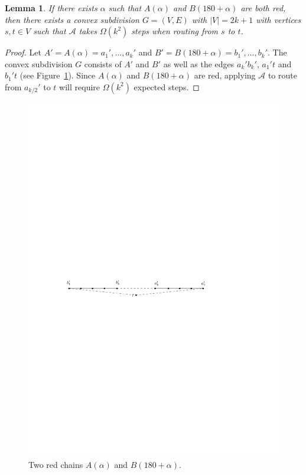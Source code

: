 \documentclass{elsarticle}
\newtheorem{lemma}{Lemma}%
\begin{document}
\begin{lemma}\label{lem:2red}
If there exists $\alpha$ such that $A(\alpha)$ and $B(180+\alpha)$ are both red, then there exists a convex subdivision $G=(V,E)$ with $|V|=2k+1$ with vertices $s,t\in V$ such that $\mathcal{A}$ takes $\Omega(k^2)$ steps when routing from $s$ to $t$.  
\end{lemma} 

\begin{proof}
Let $A'=A(\alpha)=a_1',\ldots,a_k'$ and $B'=B(180+\alpha)=b_1',\ldots,b_k'$.  The convex subdivision $G$ consists of $A'$ and $B'$ as well as the edges $a_k'b_k'$, $a_1't$ and $b_1't$ (see Figure~\ref{fig:2red}).  Since $A(\alpha)$ and $B(180+\alpha)$ are red, applying $\mathcal{A}$ to route from $a_{k/2}'$ to $t$ will require $\Omega(k^2)$ expected steps.
\end{proof}

\begin{figure}
  \centering
  \includegraphics{pics/2red.pdf}
  \caption{Two red chains $A(\alpha)$ and $B(180+\alpha)$.}
  \label{fig:2red}
\end{figure}
\end{document}
